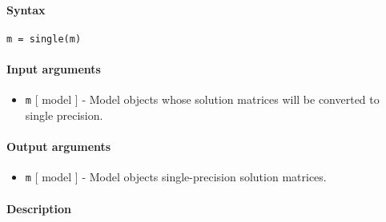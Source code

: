 


	\paragraph{Syntax}\label{syntax}

\begin{verbatim}
m = single(m)
\end{verbatim}

\paragraph{Input arguments}\label{input-arguments}

\begin{itemize}
\itemsep1pt\parskip0pt
\item
  \texttt{m} {[} model {]} - Model objects whose solution matrices will
  be converted to single precision.
\end{itemize}

\paragraph{Output arguments}\label{output-arguments}

\begin{itemize}
\itemsep1pt\parskip0pt
\item
  \texttt{m} {[} model {]} - Model objects single-precision solution
  matrices.
\end{itemize}

\paragraph{Description}\label{description}


